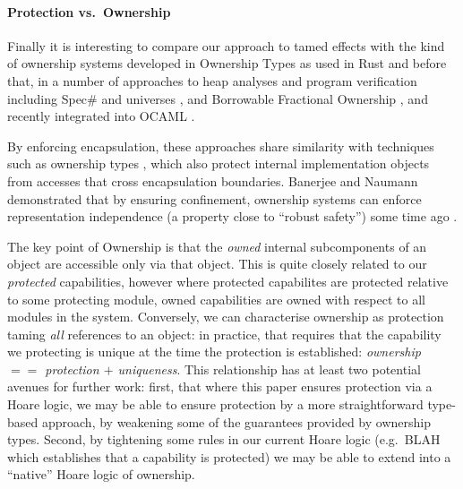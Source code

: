 \paragraph{Protection vs.\ Ownership}

Finally it is interesting to compare our approach to tamed effects
with the kind of ownership systems developed in Ownership Types
\cite{simpleOwnership,existOwn} as used in Rust
\cite{RustPL2,RustBelt18} and before that, in a number of approaches
to heap analyses \cite{PotterNC98,HillNP02,MitECOOP06} and
program verification
\cite{BoyLisShrPOPL03,hypervisor} including Spec$\#$
\cite{BarLeiSch05,BarDelFahLeiSch04} and universes
\cite{DieDroMue07,DietlMueller05,LuPotPOPL06},
and Borrowable Fractional Ownership \cite{borrow-fract-vmcai2024},
and recently integrated into OCAML \cite{ocaml-ownership-icfp2024,funk-ownership-oopsla2024}.


By enforcing encapsulation,  %
these approaches share similarity with techniques such as
ownership types \cite{ownalias,NobPotVitECOOP98}, which also
protect internal implementation objects from accesses that cross
encapsulation boundaries.  Banerjee and Naumann demonstrated that by
ensuring confinement, ownership
systems can enforce representation independence (a property close to
``robust safety'') some time ago \cite{Banerjee:2005}.


The key point of Ownership is that the \textit{owned} internal
subcomponents of an object are accessible only via that object.
This
is quite closely related to our \textit{protected} capabilities,
however where protected capabilites are protected relative to some
protecting module, owned capabilities are owned with respect to all
modules in the system.  Conversely, we can characterise ownership as
protection taming \textit{all} references to an object: in practice,
that requires that the capability we protecting is unique at the time
the protection is established: \textit{ownership $==$ protection $+$
  uniqueness}.  This relationship has at least two potential avenues
for further work: first, that where this paper ensures protection via
a Hoare logic, we may be able to ensure protection by a
more straightforward type-based approach, by weakening some of the
guarantees provided by ownership types.  Second,  by tightening some
rules in our current Hoare logic (e.g.\ BLAH which establishes that a
capability is protected) we may be able to extend into a ``native''
Hoare logic of ownership.



